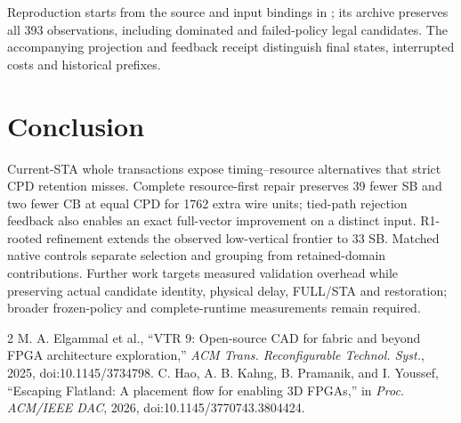 \documentclass[conference,10pt]{IEEEtran}
\begin{document}
Reproduction starts from the source and input bindings in ; its archive preserves all 393 observations, including dominated and failed-policy legal candidates. The accompanying projection and feedback receipt distinguish final states, interrupted costs and historical prefixes.

\section{Conclusion}
Current-STA whole transactions expose timing--resource alternatives that strict CPD retention misses. Complete resource-first repair preserves 39 fewer SB and two fewer CB at equal CPD for 1762 extra wire units; tied-path rejection feedback also enables an exact full-vector improvement on a distinct input. R1-rooted refinement extends the observed low-vertical frontier to 33 SB. Matched native controls separate selection and grouping from retained-domain contributions. Further work targets measured validation overhead while preserving actual candidate identity, physical delay, FULL/STA and restoration; broader frozen-policy and complete-runtime measurements remain required.

\begin{thebibliography}{2}
 M. A. Elgammal et al., ``VTR 9: Open-source CAD for fabric and beyond FPGA architecture exploration,'' \emph{ACM Trans. Reconfigurable Technol. Syst.}, 2025, doi:10.1145/3734798.
 C. Hao, A. B. Kahng, B. Pramanik, and I. Youssef, ``Escaping Flatland: A placement flow for enabling 3D FPGAs,'' in \emph{Proc. ACM/IEEE DAC}, 2026, doi:10.1145/3770743.3804424.
\end{thebibliography}
\end{document}
